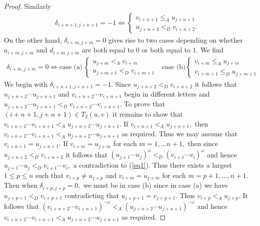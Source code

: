 \documentclass[10pt,a4paper]{amsart}
\begin{document}
\begin{proof}
Similarly 
\begin{align}\delta_{i+n+1,j+n+1}=-1\Leftrightarrow \begin{cases} v_{i+n+1}\leq_A u_{j+n+1}\\ u_{j+n+2}<_Dv_{i+n+2}.\end{cases}\end{align}
On the other hand, $\delta_{i+m,j+m}=0$ gives rise to two cases depending on whether $a_{i+m,j+m}$ and $d_{i+m,j+m}$ are both equal to $0$ or both equal to $1.$ We find
\begin{align} \delta_{i+m,j+m}=0 \Leftrightarrow \mbox{case (a)}\,\begin{cases}u_{j+m}<_A v_{i+m}\\ u_{j+m+1}<_D v_{i+m+1}\end{cases}\,\,\,\,\mbox{case (b)}\begin{cases}v_{i+m}\leq _A u_{j+m}\\ v_{i+m+1}\leq_D u_{j+m+1}\end{cases}
\end{align}
We begin with $\delta_{i+n+1,j+n+1}=-1.$ Since $u_{j+n+2}<_D v_{i+n+2}$ it follows that $u_{j+n+2}\cdots u_{j+n+1}$ and $v_{i+n+2}\cdots v_{i+n+1}$ begin in different letters and $u_{j+n+2}\cdots u_{j+n+1}<_D v_{i+n+2}\cdots v_{i+n+1}.$ 
To prove that $(i+n+1,j+n+1)\in T_2(u,v)$ it remains to show that $v_{i+n+2}\cdots v_{i+n+1} <_A u_{j+n+2}\cdots u_{j+n+1}.$
If $v_{i+n+1}<_A u_{j+n+1},$ then $v_{i+n+2}\cdots v_{i+n+1}<_A u_{j+n+2}\cdots u_{j+n+1}$ as required. Thus we may assume that
$v_{i+n+1}=u_{j+n+1}.$ If  $v_{i+m}=u_{j+m}$ for each $m=1,\ldots n+1,$  then since $u_{j+n+2}<_Dv_{i+n+2}$ it follows that $(u_{j+1}\cdots u_j)^\omega <_D (v_{i+1}\cdots v_i)^\omega$ and hence $u_{j+1}\cdots u_j <_D v_{i+1}\cdots v_i,$ a contradiction to (\ref{eq1}). 
Thus there exists a largest $1\leq p \leq n$ such that $v_{i+p}\neq  u_{j+p}$ and $v_{i+m}=u_{j+m}$ for each $m=p+1,\ldots ,n+1.$
Then when $\delta_{i+p,j+p}=0,$ we must be in case (b) since in case (a) we have $u_{j+p+1}<_D v_{i+p+1}$ contradicting that $u_{j+p+1}= v_{j+p+1}.$
Thus $ v_{i+p}<_A u_{j+p}.$   
It follows that $(v_{i+n+2}\cdots v_{i+n+1})^{-\omega} <_A (u_{j+n+2}\cdots u_{j+n+1})^{-\omega}$ and hence $v_{i+n+2}\cdots v_{i+n+1}<_A  u_{j+n+2}\cdots u_{j+n+1}$ as required.


\end{proof}
\end{document}
